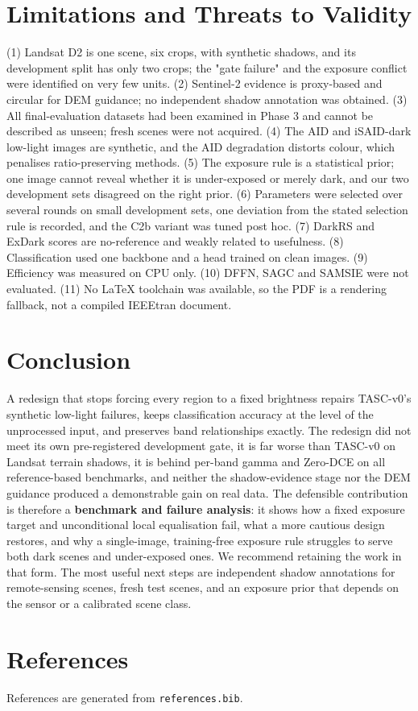 \documentclass[conference]{IEEEtran}
\begin{document}
\section{Limitations and Threats to Validity}
(1) Landsat D2 is one scene, six crops, with synthetic shadows, and its development split has only two crops; the "gate failure" and the exposure conflict were identified on very few units. (2) Sentinel-2 evidence is proxy-based and circular for DEM guidance; no independent shadow annotation was obtained. (3) All final-evaluation datasets had been examined in Phase 3 and cannot be described as unseen; fresh scenes were not acquired. (4) The AID and iSAID-dark low-light images are synthetic, and the AID degradation distorts colour, which penalises ratio-preserving methods. (5) The exposure rule is a statistical prior; one image cannot reveal whether it is under-exposed or merely dark, and our two development sets disagreed on the right prior. (6) Parameters were selected over several rounds on small development sets, one deviation from the stated selection rule is recorded, and the C2b variant was tuned post hoc. (7) DarkRS and ExDark scores are no-reference and weakly related to usefulness. (8) Classification used one backbone and a head trained on clean images. (9) Efficiency was measured on CPU only. (10) DFFN, SAGC and SAMSIE were not evaluated. (11) No LaTeX toolchain was available, so the PDF is a rendering fallback, not a compiled IEEEtran document.

\section{Conclusion}
A redesign that stops forcing every region to a fixed brightness repairs TASC-v0's synthetic low-light failures, keeps classification accuracy at the level of the unprocessed input, and preserves band relationships exactly. The redesign did not meet its own pre-registered development gate, it is far worse than TASC-v0 on Landsat terrain shadows, it is behind per-band gamma and Zero-DCE on all reference-based benchmarks, and neither the shadow-evidence stage nor the DEM guidance produced a demonstrable gain on real data. The defensible contribution is therefore a \textbf{benchmark and failure analysis}: it shows how a fixed exposure target and unconditional local equalisation fail, what a more cautious design restores, and why a single-image, training-free exposure rule struggles to serve both dark scenes and under-exposed ones. We recommend retaining the work in that form. The most useful next steps are independent shadow annotations for remote-sensing scenes, fresh test scenes, and an exposure prior that depends on the sensor or a calibrated scene class.

\section{References}
References are generated from \texttt{references.bib}.



\end{document}
